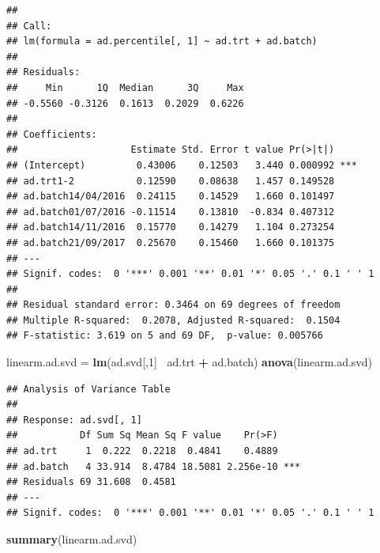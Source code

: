 \documentclass[]{book}
\newenvironment{Shaded}{\begin{snugshade}}{\end{snugshade}}
\newcommand{\KeywordTok}[1]{\textcolor[rgb]{0.13,0.29,0.53}{\textbf{#1}}}
\newcommand{\DecValTok}[1]{\textcolor[rgb]{0.00,0.00,0.81}{#1}}
\newcommand{\StringTok}[1]{\textcolor[rgb]{0.31,0.60,0.02}{#1}}
\newcommand{\OperatorTok}[1]{\textcolor[rgb]{0.81,0.36,0.00}{\textbf{#1}}}
\newcommand{\NormalTok}[1]{#1}
\begin{document}
\begin{verbatim}
## 
## Call:
## lm(formula = ad.percentile[, 1] ~ ad.trt + ad.batch)
## 
## Residuals:
##     Min      1Q  Median      3Q     Max 
## -0.5560 -0.3126  0.1613  0.2029  0.6226 
## 
## Coefficients:
##                    Estimate Std. Error t value Pr(>|t|)    
## (Intercept)         0.43006    0.12503   3.440 0.000992 ***
## ad.trt1-2           0.12590    0.08638   1.457 0.149528    
## ad.batch14/04/2016  0.24115    0.14529   1.660 0.101497    
## ad.batch01/07/2016 -0.11514    0.13810  -0.834 0.407312    
## ad.batch14/11/2016  0.15770    0.14279   1.104 0.273254    
## ad.batch21/09/2017  0.25670    0.15460   1.660 0.101375    
## ---
## Signif. codes:  0 '***' 0.001 '**' 0.01 '*' 0.05 '.' 0.1 ' ' 1
## 
## Residual standard error: 0.3464 on 69 degrees of freedom
## Multiple R-squared:  0.2078, Adjusted R-squared:  0.1504 
## F-statistic: 3.619 on 5 and 69 DF,  p-value: 0.005766
\end{verbatim}

\begin{Shaded}
\begin{Highlighting}[]
\NormalTok{linearm.ad.svd =}\StringTok{ }\KeywordTok{lm}\NormalTok{(ad.svd[,}\DecValTok{1}\NormalTok{]}\OperatorTok{~}\StringTok{ }\NormalTok{ad.trt }\OperatorTok{+}\StringTok{ }\NormalTok{ad.batch)}
\KeywordTok{anova}\NormalTok{(linearm.ad.svd)}
\end{Highlighting}
\end{Shaded}

\begin{verbatim}
## Analysis of Variance Table
## 
## Response: ad.svd[, 1]
##           Df Sum Sq Mean Sq F value    Pr(>F)    
## ad.trt     1  0.222  0.2218  0.4841    0.4889    
## ad.batch   4 33.914  8.4784 18.5081 2.256e-10 ***
## Residuals 69 31.608  0.4581                      
## ---
## Signif. codes:  0 '***' 0.001 '**' 0.01 '*' 0.05 '.' 0.1 ' ' 1
\end{verbatim}

\begin{Shaded}
\begin{Highlighting}[]
\KeywordTok{summary}\NormalTok{(linearm.ad.svd)}
\end{Highlighting}
\end{Shaded}
\end{document}
